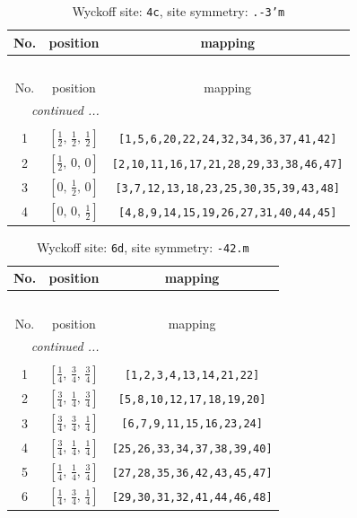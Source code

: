 \documentclass[fleqn,8pt]{jsarticle}
\begin{document}
\renewcommand{\arraystretch}{1.2}
\begin{longtable}{ccc}
\caption{Wyckoff site: {\tt 4c}, site symmetry: {\tt .-3'm}}
 \\
 \hline \hline
No. & position & mapping \\ \hline \endfirsthead

\multicolumn{2}{l}{\tablename\ \thetable{}} \\
 \hline \hline
No. & position & mapping \\ \hline \endhead

 \hline \hline
\multicolumn{2}{r}{\footnotesize\it continued ...} \\ \endfoot

 \hline \hline
\multicolumn{2}{r}{} \\ \endlastfoot

1 & $\left[ \frac{1}{2},\, \frac{1}{2},\, \frac{1}{2} \right]$ & {\tt [1,5,6,20,22,24,32,34,36,37,41,42]} \\ \hline
2 & $\left[ \frac{1}{2},\, 0,\, 0 \right]$ & {\tt [2,10,11,16,17,21,28,29,33,38,46,47]} \\ \hline
3 & $\left[ 0,\, \frac{1}{2},\, 0 \right]$ & {\tt [3,7,12,13,18,23,25,30,35,39,43,48]} \\ \hline
4 & $\left[ 0,\, 0,\, \frac{1}{2} \right]$ & {\tt [4,8,9,14,15,19,26,27,31,40,44,45]} \\
\end{longtable}
\renewcommand{\arraystretch}{1.2}
\begin{longtable}{ccc}
\caption{Wyckoff site: {\tt 6d}, site symmetry: {\tt -42.m}}
 \\
 \hline \hline
No. & position & mapping \\ \hline \endfirsthead

\multicolumn{2}{l}{\tablename\ \thetable{}} \\
 \hline \hline
No. & position & mapping \\ \hline \endhead

 \hline \hline
\multicolumn{2}{r}{\footnotesize\it continued ...} \\ \endfoot

 \hline \hline
\multicolumn{2}{r}{} \\ \endlastfoot

1 & $\left[ \frac{1}{4},\, \frac{3}{4},\, \frac{3}{4} \right]$ & {\tt [1,2,3,4,13,14,21,22]} \\ \hline
2 & $\left[ \frac{3}{4},\, \frac{1}{4},\, \frac{3}{4} \right]$ & {\tt [5,8,10,12,17,18,19,20]} \\ \hline
3 & $\left[ \frac{3}{4},\, \frac{3}{4},\, \frac{1}{4} \right]$ & {\tt [6,7,9,11,15,16,23,24]} \\ \hline
4 & $\left[ \frac{3}{4},\, \frac{1}{4},\, \frac{1}{4} \right]$ & {\tt [25,26,33,34,37,38,39,40]} \\ \hline
5 & $\left[ \frac{1}{4},\, \frac{1}{4},\, \frac{3}{4} \right]$ & {\tt [27,28,35,36,42,43,45,47]} \\ \hline
6 & $\left[ \frac{1}{4},\, \frac{3}{4},\, \frac{1}{4} \right]$ & {\tt [29,30,31,32,41,44,46,48]} \\
\end{longtable}
\end{document}
